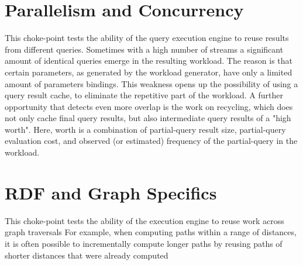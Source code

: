 


\section{Parallelism and Concurrency}


This choke-point tests the ability of the query execution engine to reuse results from different queries. Sometimes with a high number of streams a significant amount of identical queries emerge in the resulting workload.
The reason is that certain parameters, as generated by the workload generator, have only a limited amount of parameters bindings.
This weakness opens up the possibility of using a query result cache, to eliminate the repetitive part of the workload.
A further opportunity that detects even more overlap is the work on recycling, which does not only cache final query results, but also intermediate query results of a "high worth".
Here, worth is a combination of partial-query result size, partial-query evaluation cost, and observed (or estimated) frequency of the partial-query in the workload.




\section{RDF and Graph Specifics}


This choke-point tests the ability of the execution engine to reuse work across graph traversals 
For example, when computing paths within a range of distances, it is often possible to incrementally compute longer paths by reusing paths of shorter distances that were already computed



